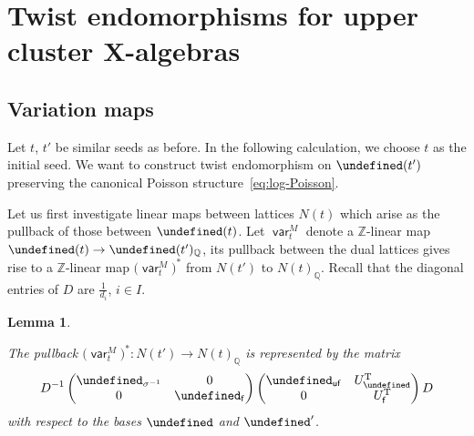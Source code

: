 \documentclass[10pt,a4paper]{amsart}
\newcommand{\Z}{\mathbb{Z}}
\newcommand{\Q}{\mathbb{Q}}
\newcommand{\opname}[1]{\operatorname{\mathsf{#1}}}
\newcommand{\var}{\opname{var}}
\newcommand{\fv}{\opname{f}}
\newcommand{\ufv}{\opname{uf}}
\let\Mc\undefined
\let\XClAlg\undefined
\let\Id\undefined
\let\trans\undefined
\let\ee\undefined
\let\uee\undefined
\let\low\undefined
\newcommand{\Mc}{M^\circ}
\newcommand{\XClAlg}{\mathcal{U}^X}
\newcommand{\Id}{{\opname{Id}}}
\newcommand{\trans}{\opname{P}}
\newcommand{\ee}{\mathbf{e}}
\newcommand{\uee}{\underline{\ee}}
\newcommand{\low}{\opname{\fv,\ufv}}
\numberwithin{equation}{section}
\newtheorem{Lemma}[Theorem]{Lemma}
\begin{document}
\section[Twist endomorphisms for upper cluster X-algebras]{Twist endomorphisms for upper cluster $\boldsymbol{X}$-algebras}\label{sec:Twist-endomorphisms-X}

\subsection{Variation maps}\label{subsec:Variation-N-maps}

Let $t$, $t'$ be similar seeds as before. In the following calculation,
we choose $t$ as the initial seed. We want to construct twist endomorphism
on $\XClAlg(t')$ preserving the canonical Poisson structure~\eqref{eq:log-Poisson}.

Let us first investigate linear maps between lattices $N(t)$ which
arise as the pullback of those between $\Mc(t)$. Let $\var_{t}^{M}$
denote a $\Z$-linear map $\Mc(t)\rightarrow\Mc(t')_{\Q}$,
its pullback between the dual lattices gives rise to a $\Z$-linear
map $\bigl(\var_{t}^{M}\bigr)^{*}$ from $N(t')$ to $N(t)_{\Q}$. Recall that
the diagonal entries of $D$ are $\frac{1}{d_{i}}$, $i\in I$.

\begin{Lemma}\label{lem:pullback_matrix}

The pullback $\bigl(\var_{t}^{M}\bigr)^{*}\colon N(t')\rightarrow N(t)_{\Q}$ is represented
by the matrix \[D^{-1}\begin{pmatrix}
\trans_{\sigma^{-1}} & 0\\
0 & \Id_{\fv}
\end{pmatrix}\begin{pmatrix}
\Id_{\ufv} & U_{\low}^{\rm T}\\
0 & U_{\fv}^{\rm T}
\end{pmatrix}D\]
 with respect to the bases $\uee$ and $\uee'$.

\end{Lemma}
\end{document}

